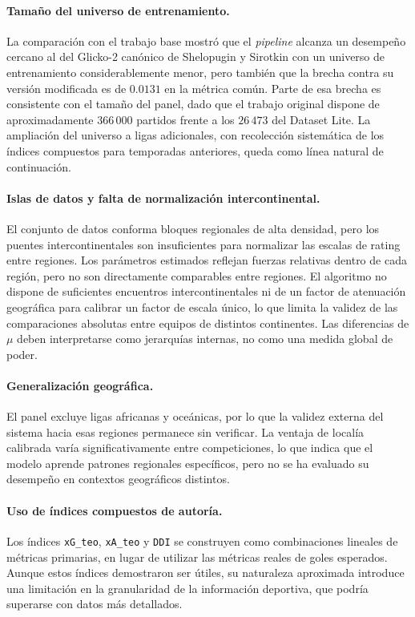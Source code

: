 \paragraph{Tama\~no del universo de entrenamiento.} La comparaci\'on con el trabajo base mostr\'o que el \textit{pipeline} alcanza un desempe\~no cercano al del Glicko-2 can\'onico de Shelopugin y Sirotkin con un universo de entrenamiento considerablemente menor, pero tambi\'en que la brecha contra su versi\'on modificada es de $0{.}0131$ en la m\'etrica com\'un. Parte de esa brecha es consistente con el tama\~no del panel, dado que el trabajo original dispone de aproximadamente $366\,000$ partidos frente a los $26\,473$ del Dataset Lite. La ampliaci\'on del universo a ligas adicionales, con recolecci\'on sistem\'atica de los \'indices compuestos para temporadas anteriores, queda como l\'inea natural de continuaci\'on.

\paragraph{Islas de datos y falta de normalizaci\'on intercontinental.} El conjunto de datos conforma bloques regionales de alta densidad, pero los puentes intercontinentales son insuficientes para normalizar las escalas de rating entre regiones. Los par\'ametros estimados reflejan fuerzas relativas dentro de cada regi\'on, pero no son directamente comparables entre regiones. El algoritmo no dispone de suficientes encuentros intercontinentales ni de un factor de atenuaci\'on geogr\'afica para calibrar un factor de escala \'unico, lo que limita la validez de las comparaciones absolutas entre equipos de distintos continentes. Las diferencias de $\mu$ deben interpretarse como jerarqu\'ias internas, no como una medida global de poder.

\paragraph{Generalizaci\'on geogr\'afica.} El panel excluye ligas africanas y oce\'anicas, por lo que la validez externa del sistema hacia esas regiones permanece sin verificar. La ventaja de local\'ia calibrada var\'ia significativamente entre competiciones, lo que indica que el modelo aprende patrones regionales espec\'ificos, pero no se ha evaluado su desempe\~no en contextos geogr\'aficos distintos.

\paragraph{Uso de \'indices compuestos de autor\'ia.} Los \'indices \texttt{xG\_teo}, \texttt{xA\_teo} y \texttt{DDI} se construyen como combinaciones lineales de m\'etricas primarias, en lugar de utilizar las m\'etricas reales de goles esperados. Aunque estos \'indices demostraron ser \'utiles, su naturaleza aproximada introduce una limitaci\'on en la granularidad de la informaci\'on deportiva, que podr\'ia superarse con datos m\'as detallados.

